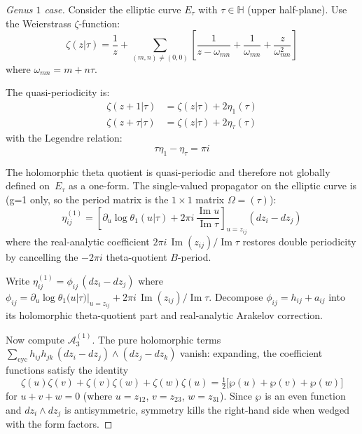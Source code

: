 \begin{proof}[Genus $1$ case]
Consider the elliptic curve $E_\tau$ with $\tau \in \mathbb{H}$ (upper half-plane). Use the Weierstrass $\zeta$-function:
\begin{equation}
\zeta(z|\tau) = \frac{1}{z} + \sum_{(m,n) \neq (0,0)} \left[\frac{1}{z - \omega_{mn}} + \frac{1}{\omega_{mn}} + \frac{z}{\omega_{mn}^2}\right]
\end{equation}
where $\omega_{mn} = m + n\tau$.

The quasi-periodicity is:
\begin{align}
\zeta(z + 1|\tau) &= \zeta(z|\tau) + 2\eta_1(\tau)\\
\zeta(z + \tau|\tau) &= \zeta(z|\tau) + 2\eta_\tau(\tau)
\end{align}
with the Legendre relation:
\begin{equation}
\tau \eta_1 - \eta_\tau = \pi i
\end{equation}

The holomorphic theta quotient is quasi-periodic and therefore not globally defined on~$E_\tau$ as a one-form. The single-valued propagator on the elliptic curve is \textup{(}g=1 only, so the period matrix is the $1\times 1$ matrix $\Omega = (\tau)$\textup{)}:
\begin{equation}\label{eq:genus-1-propagator-full}
\eta_{ij}^{(1)}
=
\left[
\partial_u\log\theta_1(u|\tau)
+2\pi i\,\frac{\operatorname{Im}u}{\operatorname{Im}\tau}
\right]_{u=z_{ij}}
(dz_i-dz_j)
\end{equation}
where the real-analytic coefficient
$2\pi i\,\operatorname{Im}(z_{ij})/\operatorname{Im}\tau$ restores
double periodicity by cancelling the $-2\pi i$ theta-quotient
$B$-period.

Write $\eta_{ij}^{(1)} = \phi_{ij}\,(dz_i - dz_j)$ where
$\phi_{ij}=\partial_u\log\theta_1(u|\tau)|_{u=z_{ij}}+
2\pi i\,\operatorname{Im}(z_{ij})/\operatorname{Im}\tau$. Decompose
$\phi_{ij}=h_{ij}+a_{ij}$ into its holomorphic theta-quotient part
and real-analytic Arakelov correction.

Now compute $\mathcal{A}_3^{(1)}$. The pure holomorphic terms $\sum_{\mathrm{cyc}} h_{ij}h_{jk}\,(dz_i - dz_j)\wedge(dz_j - dz_k)$ vanish: expanding, the coefficient functions satisfy the identity
\begin{equation}
\zeta(u)\zeta(v) + \zeta(v)\zeta(w) + \zeta(w)\zeta(u) = \tfrac{1}{2}\bigl[\wp(u) + \wp(v) + \wp(w)\bigr]
\end{equation}
for $u+v+w = 0$ (where $u = z_{12}$, $v = z_{23}$, $w = z_{31}$). Since $\wp$ is an even function and $dz_i \wedge dz_j$ is antisymmetric, symmetry kills the right-hand side when wedged with the form factors.


\end{proof}
